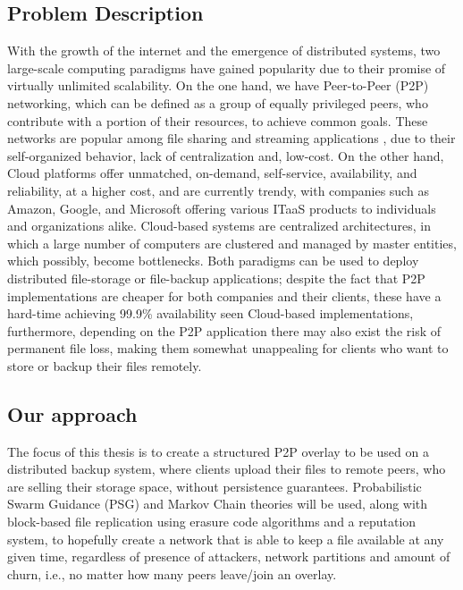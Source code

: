 \documentclass[runningheads]{llncs}
\begin{document}
\subsection{Problem Description}
With the growth of the internet and the emergence of distributed systems, two large-scale computing paradigms have gained popularity due to their promise of virtually unlimited scalability. On the one hand, we have Peer-to-Peer (P2P) networking, which can be defined as a group of equally privileged peers, who contribute with a portion of their resources, to achieve common goals. These networks are popular among file sharing and streaming applications \cite{ssaroiu:msp2pfss}, due to their self-organized behavior, lack of centralization and, low-cost. On the other hand, Cloud platforms offer unmatched, on-demand, self-service, availability, and reliability, at a higher cost, and are currently trendy, with companies such as Amazon, Google, and Microsoft offering various ITaaS products to individuals and organizations alike. Cloud-based systems are centralized architectures, in which a large number of computers are clustered and managed by master entities, which possibly, become bottlenecks. Both paradigms can be used to deploy distributed file-storage or file-backup applications; despite the fact that P2P implementations are cheaper for both companies and their clients, these have a hard-time achieving 99.9\% availability seen Cloud-based implementations, furthermore, depending on the P2P application there may also exist the risk of permanent file loss, making them somewhat unappealing for clients who want to store or backup their files remotely.

\subsection{Our approach}
The focus of this thesis is to create a structured P2P overlay to be used on a distributed backup system, where clients upload their files to remote peers, who are selling their storage space, without persistence guarantees. Probabilistic Swarm Guidance (PSG) and Markov Chain theories \cite{markovchain_approach_to_pga} will be used, along with block-based file replication using erasure code algorithms and a reputation system, to hopefully create a network that is able to keep a file available at any given time, regardless of presence of attackers, network partitions and amount of churn, i.e., no matter how many peers leave/join an overlay.
\end{document}
